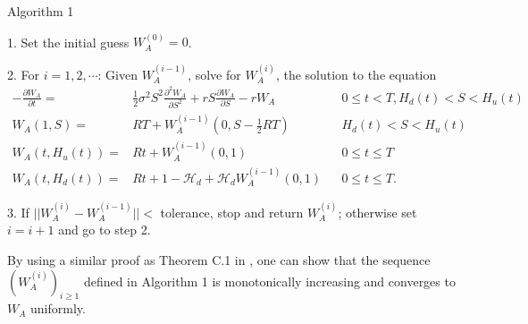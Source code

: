 \documentclass[draft, noinfoline]{ectaart}
\numberwithin{equation}{section}
\theoremstyle{plain}
\begin{document}
\begin{appendices}
\begin{center}
Algorithm 1
\end{center}

1. Set the initial guess $W_{A}^{(0)}=0$.

2.  For $i=1,2,\cdots$: Given $W_{A}^{(i-1)}$, solve for $W_{A}^{(i)}$, the solution to the equation
\begin{align*}
-\frac{\partial W_{A}}{\partial t}= & \frac{1}{2}\sigma^{2}S^{2}\frac{\partial^{2}W_{A}}{\partial S^{2}}+r S\frac{\partial W_{A}}{\partial S}-r W_{A} &  & 0\le t<T,H_{d}(t)<S<H_{u}(t)\\
W_{A}(1,S)= & RT+W_{A}^{(i-1)}(0,S-\frac{1}{2}RT) &  & H_{d}(t)<S<H_{u}(t)\\
W_{A}(t,H_{u}(t))= & Rt+W_{A}^{(i-1)}(0,1) &  & 0\le t\le T\\
W_{A}(t,H_{d}(t))= & Rt+1-\mathcal{H}_{d}+\mathcal{H}_{d}W_{A}^{(i-1)}(0,1) &  & 0\le t\le T.
\end{align*}


3.  If $||W_{A}^{(i)}-W_{A}^{(i-1)}||<$ tolerance, stop and return $W_{A}^{(i)}$; otherwise set $i=i+1$ and go to step 2.

By using a similar proof as Theorem C.1 in \cite{dai_overpricing_2018}, one can show that the sequence $(W_{A}^{(i)})_{i\ge1}$ defined in Algorithm 1 is monotonically increasing and converges to $W_{A}$ uniformly.


\end{appendices}
\end{document}

